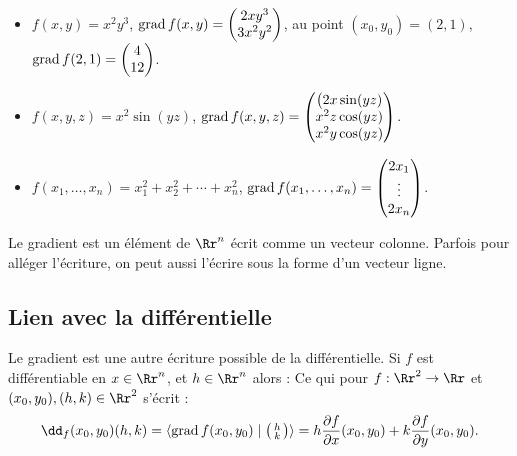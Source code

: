 \documentclass[12pt, class=report,crop=false]{standalone}
\begin{document}
\begin{exemple}
\sauteligne
\begin{itemize}
\item $f(x,y) = x^2y^3$, $\operatorname{grad} f (x,y) =  \begin{pmatrix}2xy^3\\3x^2y^2\end{pmatrix}$,
au point $(x_0,y_0)=(2,1)$, $\operatorname{grad} f (2,1) =  \begin{pmatrix}4\\12\end{pmatrix}$.

\item $f(x,y,z) = x^2\sin(yz)$, $\operatorname{grad} f (x,y,z) = \begin{pmatrix} \big(2x\sin(yz) \\ x^2z \cos(yz) \\ x^2y\cos(yz) \end{pmatrix}$.

\item $f(x_1,\ldots,x_n)= x_1^2+x_2^2+\cdots + x_n^2$, $\operatorname{grad} f (x_1,\ldots,x_n) =  \begin{pmatrix}2x_1\\ \vdots \\2x_n\end{pmatrix}$.
\end{itemize}
\end{exemple}

\begin{remarque*}
Le gradient est un élément de $\Rr^n$ écrit comme un vecteur colonne. Parfois pour alléger l'écriture, on peut aussi l'écrire sous la forme d'un vecteur ligne.
\end{remarque*}


\subsection{Lien avec la différentielle}



Le gradient est une autre écriture possible de la différentielle.
Si $f$ est différentiable en $x \in \Rr^n$, et $h \in \Rr^n$ alors :
Ce qui pour $f: \Rr^2 \to \Rr$ et $(x_0,y_0),(h,k) \in \Rr^2$ s'écrit :
$$\dd_f (x_0,y_0) (h,k) = \langle \grad f (x_0,y_0) \mid \left(\begin{smallmatrix}h\\k\end{smallmatrix}\right) \rangle
= h\frac{\partial f}{\partial x}(x_0,y_0)
+k\frac{\partial f}{\partial y}(x_0,y_0).$$
\end{document}
